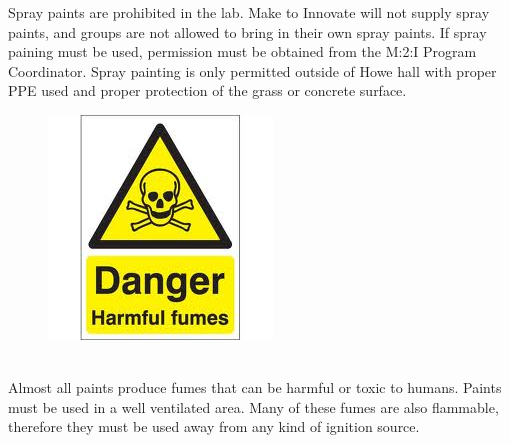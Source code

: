 Spray paints are prohibited in the lab. Make to Innovate will not supply spray paints, and groups are not allowed to bring in their own spray paints.  If spray paining must be used, permission must be obtained from the M:2:I Program Coordinator.  Spray painting is only permitted outside of Howe hall with proper PPE used and proper protection of the grass or concrete surface.  
\begin{framed}
\begin{figure}
\includegraphics[width=\linewidth]{images/fumes_hazard.jpg}
\end{figure}
\ \\
Almost all paints produce fumes that can be harmful or toxic to humans.  Paints must be used in a well ventilated area.  Many of these fumes are also flammable, therefore they must be used away from any kind of ignition source.
\end{framed}